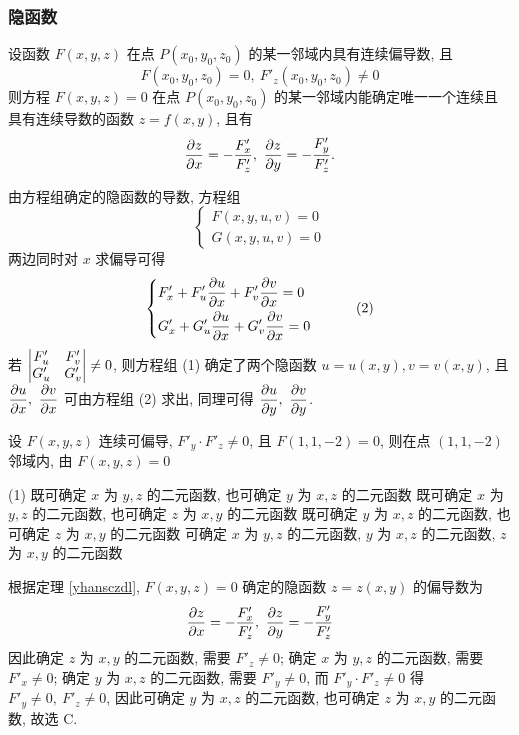 \subsubsection{隐函数}

\begin{theorem}[隐函数存在定理 A]
    \label{yhansczdl}设函数 $F(x,y,z)$ 在点 $P(x_0,y_0,z_0)$ 的某一邻域内具有连续偏导数, 且 $$F(x_0,y_0,z_0)=0,~F'_z(x_0,y_0,z_0)\neq 0$$
    则方程 $F(x,y,z)=0$ 在点 $P(x_0,y_0,z_0)$ 的某一邻域内能确定唯一一个连续且具有连续导数的函数 $z=f(x,y)$, 且有
    $$\pdv{z}{x}=-\dfrac{F'_x}{F'_z},~\pdv{z}{y}=-\dfrac{F'_y}{F'_z}.$$
\end{theorem}

\begin{theorem}[隐函数存在定理 B]
    由方程组确定的隐函数的导数, 方程组
    \begin{equation*}
        \begin{cases}
            F(x,y,u,v)=0 \\G(x,y,u,v)=0
        \end{cases}
        \tag*{(1)}
    \end{equation*}
    两边同时对 $x$ 求偏导可得
    \begin{equation*}
        \begin{cases}
            \displaystyle F'_x+F'_u\pdv{u}{x}+F'_v\pdv{v}{x}=0 \\[6pt]
            \displaystyle G'_x+G'_u\pdv{u}{x}+G'_v\pdv{v}{x}=0
        \end{cases}
        \tag*{(2)}
    \end{equation*}
    若 $\mqty|F'_u&F'_v\\G'_u&G'_v|\neq 0$, 则方程组 (1) 确定了两个隐函数 $u=u(x,y),v=v(x,y)$, 且 $\displaystyle\pdv{u}{x},~\pdv{v}{x}$ 可由方程组 (2) 求出, 
    同理可得 $\displaystyle\pdv{u}{y},~\pdv{v}{y}$.
\end{theorem}

\begin{example}
    设 $F(x,y,z)$ 连续可偏导, $F'_y\cdot F'_z\neq 0$, 且 $F(1,1,-2)=0$, 则在点 $(1,1,-2)$ 邻域内, 由 $F(x,y,z)=0$
    \begin{tasks}(1)
        \task 既可确定 $x$ 为 $y,z$ 的二元函数, 也可确定 $y$ 为 $x,z$ 的二元函数
        \task 既可确定 $x$ 为 $y,z$ 的二元函数, 也可确定 $z$ 为 $x,y$ 的二元函数
        \task 既可确定 $y$ 为 $x,z$ 的二元函数, 也可确定 $z$ 为 $x,y$ 的二元函数
        \task 可确定 $x$ 为 $y,z$ 的二元函数, $y$ 为 $x,z$ 的二元函数,  $z$ 为 $x,y$ 的二元函数
    \end{tasks}
\end{example}
\begin{solution}
    根据定理 \ref{yhansczdl}, $F(x,y,z)=0$ 确定的隐函数 $z=z(x,y)$ 的偏导数为
    $$\pdv{z}{x}=-\dfrac{F'_x}{F'_z},~\pdv{z}{y}=-\dfrac{F'_y}{F'_z}$$
    因此确定 $z$ 为 $x,y$ 的二元函数, 需要 $F'_z\neq0$; 确定 $x$ 为 $y,z$ 的二元函数, 需要 $F'_x\neq0$; 确定 $y$ 为 $x,z$ 的二元函数, 需要 $F'_y\neq0$, 
    而 $F'_y\cdot F'_z\neq 0$ 得 $F'_y\neq0,~F'_z\neq0$, 因此可确定 $y$ 为 $x,z$ 的二元函数, 也可确定 $z$ 为 $x,y$ 的二元函数, 故选 C.
\end{solution}

